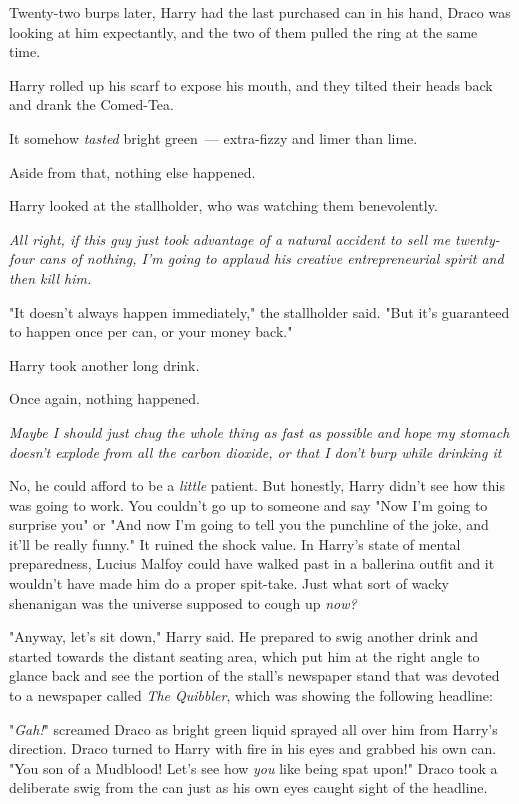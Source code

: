 Twenty-two burps later, Harry had the last purchased can in his hand, Draco was
looking at him expectantly, and the two of them pulled the ring at the same
time.

Harry rolled up his scarf to expose his mouth, and they tilted their heads back
and drank the Comed-Tea.

It somehow \emph{tasted} bright green~--- extra-fizzy and limer than lime.

Aside from that, nothing else happened.

Harry looked at the stallholder, who was watching them benevolently.

\emph{All right, if this guy just took advantage of a natural accident to sell
me twenty-four cans of nothing, I'm going to applaud his creative
entrepreneurial spirit and then kill him.}

"It doesn't always happen immediately," the stallholder said. "But it's
guaranteed to happen once per can, or your money back."

Harry took another long drink.

Once again, nothing happened.

\emph{Maybe I should just chug the whole thing as fast as possible{\el} and
hope my stomach doesn't explode from all the carbon dioxide, or that I don't
burp while drinking it{\el}}

No, he could afford to be a \emph{little} patient. But honestly, Harry didn't
see how this was going to work. You couldn't go up to someone and say "Now I'm
going to surprise you" or "And now I'm going to tell you the punchline of the
joke, and it'll be really funny." It ruined the shock value. In Harry's state
of mental preparedness, Lucius Malfoy could have walked past in a ballerina
outfit and it wouldn't have made him do a proper spit-take. Just what sort of
wacky shenanigan was the universe supposed to cough up \emph{now?}

"Anyway, let's sit down," Harry said. He prepared to swig another drink and
started towards the distant seating area, which put him at the right angle to
glance back and see the portion of the stall's newspaper stand that was devoted
to a newspaper called \emph{The Quibbler}, which was showing the following
headline:


"\emph{Gah!}" screamed Draco as bright green liquid sprayed all over him from
Harry's direction. Draco turned to Harry with fire in his eyes and grabbed his
own can. "You son of a Mudblood! Let's see how \emph{you} like being spat
upon!" Draco took a deliberate swig from the can just as his own eyes caught
sight of the headline.

